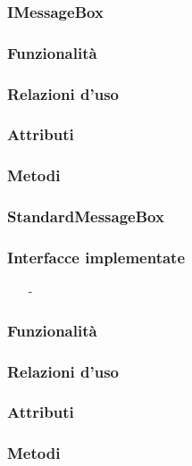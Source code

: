 \subsubsection{IMessageBox}\label{sec:imessagebox}

\subsubsection*{Funzionalità}

\subsubsection*{Relazioni d'uso}

\subsubsection*{Attributi}

\subsubsection*{Metodi}

\subsubsection{StandardMessageBox}\label{sec:standardmessagebox}

\subsubsection*{Interfacce implementate}
\begin{itemize}[noitemsep,nolistsep]
  \item[-]
\end{itemize}

\subsubsection*{Funzionalità}

\subsubsection*{Relazioni d'uso}

\subsubsection*{Attributi}

\subsubsection*{Metodi}

